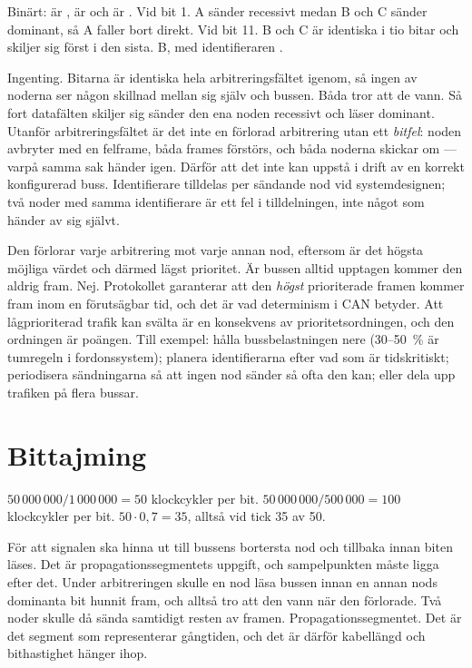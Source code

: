 Binärt:  är ,  är  och  är
.
 Vid bit 1. A sänder recessivt medan B och C sänder dominant, så A faller bort direkt.
 Vid bit 11. B och C är identiska i tio bitar och skiljer sig först i den sista.
 B, med identifieraren .

 Ingenting. Bitarna är identiska hela arbitreringsfältet igenom, så ingen av noderna ser
någon skillnad mellan sig själv och bussen. Båda tror att de vann.
 Så fort datafälten skiljer sig sänder den ena noden recessivt och läser dominant. Utanför
arbitreringsfältet är det inte en förlorad arbitrering utan ett \emph{bitfel}: noden avbryter med
en felframe, båda frames förstörs, och båda noderna skickar om --- varpå samma sak händer igen.
 Därför att det inte kan uppstå i drift av en korrekt konfigurerad buss. Identifierare
tilldelas per sändande nod vid systemdesignen; två noder med samma identifierare är ett fel i
tilldelningen, inte något som händer av sig självt.

 Den förlorar varje arbitrering mot varje annan nod, eftersom  är det högsta
möjliga värdet och därmed lägst prioritet. Är bussen alltid upptagen kommer den aldrig fram.
 Nej. Protokollet garanterar att den \emph{högst} prioriterade framen kommer fram inom en
förutsägbar tid, och det är vad determinism i CAN betyder. Att lågprioriterad trafik kan svälta
är en konsekvens av prioritetsordningen, och den ordningen är poängen.
 Till exempel: hålla bussbelastningen nere (30--50~\% är tumregeln i fordonssystem);
planera identifierarna efter vad som är tidskritiskt; periodisera sändningarna så att ingen nod
sänder så ofta den kan; eller dela upp trafiken på flera bussar.

\section{Bittajming}

 $50\,000\,000 / 1\,000\,000 = 50$ klockcykler per bit.
 $50\,000\,000 / 500\,000 = 100$ klockcykler per bit.
 $50 \cdot 0{,}7 = 35$, alltså vid tick 35 av 50.

 För att signalen ska hinna ut till bussens bortersta nod och tillbaka innan biten läses.
Det är propagationssegmentets uppgift, och sampelpunkten måste ligga efter det.
 Under arbitreringen skulle en nod läsa bussen innan en annan nods dominanta bit hunnit
fram, och alltså tro att den vann när den förlorade. Två noder skulle då sända samtidigt resten
av framen.
 Propagationssegmentet. Det är det segment som representerar gångtiden, och det är därför
kabellängd och bithastighet hänger ihop.

